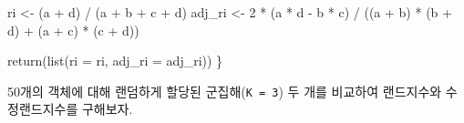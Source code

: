 \documentclass[
]{book}
\newenvironment{Shaded}{\begin{snugshade}}{\end{snugshade}}
\newcommand{\AttributeTok}[1]{\textcolor[rgb]{0.77,0.63,0.00}{#1}}
\newcommand{\DecValTok}[1]{\textcolor[rgb]{0.00,0.00,0.81}{#1}}
\newcommand{\FunctionTok}[1]{\textcolor[rgb]{0.00,0.00,0.00}{#1}}
\newcommand{\NormalTok}[1]{#1}
\newcommand{\OtherTok}[1]{\textcolor[rgb]{0.56,0.35,0.01}{#1}}
\newcommand{\SpecialCharTok}[1]{\textcolor[rgb]{0.00,0.00,0.00}{#1}}
\begin{document}
\begin{Shaded}
\begin{Highlighting}[]
\NormalTok{  ri }\OtherTok{\textless{}{-}}\NormalTok{ (a }\SpecialCharTok{+}\NormalTok{ d) }\SpecialCharTok{/}\NormalTok{ (a }\SpecialCharTok{+}\NormalTok{ b }\SpecialCharTok{+}\NormalTok{ c }\SpecialCharTok{+}\NormalTok{ d)}
\NormalTok{  adj\_ri }\OtherTok{\textless{}{-}} \DecValTok{2} \SpecialCharTok{*}\NormalTok{ (a }\SpecialCharTok{*}\NormalTok{ d }\SpecialCharTok{{-}}\NormalTok{ b }\SpecialCharTok{*}\NormalTok{ c) }\SpecialCharTok{/} 
\NormalTok{    ((a }\SpecialCharTok{+}\NormalTok{ b) }\SpecialCharTok{*}\NormalTok{ (b }\SpecialCharTok{+}\NormalTok{ d) }\SpecialCharTok{+}\NormalTok{ (a }\SpecialCharTok{+}\NormalTok{ c) }\SpecialCharTok{*}\NormalTok{ (c }\SpecialCharTok{+}\NormalTok{ d))}

  \FunctionTok{return}\NormalTok{(}\FunctionTok{list}\NormalTok{(}\AttributeTok{ri =}\NormalTok{ ri, }\AttributeTok{adj\_ri =}\NormalTok{ adj\_ri))}
\NormalTok{\}}
\end{Highlighting}
\end{Shaded}

50개의 객체에 대해 랜덤하게 할당된 군집해(\texttt{K\ =\ 3}) 두 개를 비교하여 랜드지수와 수정랜드지수를 구해보자.
\end{document}

